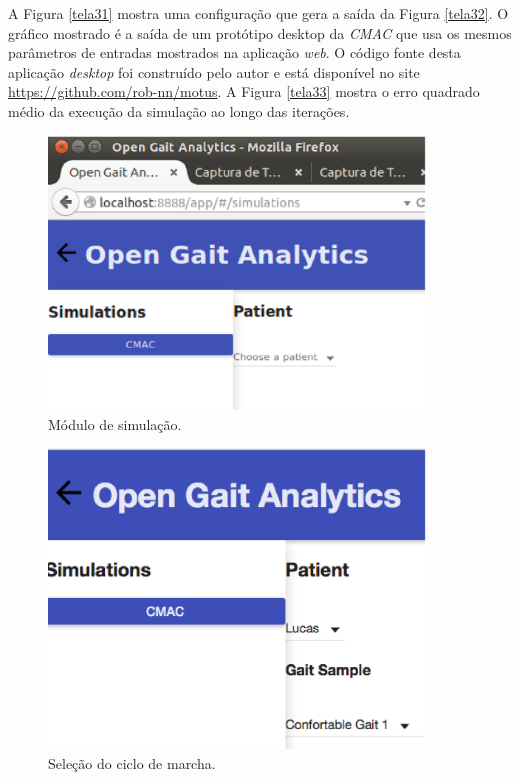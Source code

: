 A Figura \ref{tela31} mostra uma configuração que gera a saída da Figura \ref{tela32}.  O gráfico mostrado é a saída de um protótipo desktop da \emph{CMAC} que usa os mesmos parâmetros de entradas mostrados na aplicação \emph{web}. 
O código fonte desta aplicação \emph{desktop} foi construído pelo autor e está disponível no site \url{https://github.com/rob-nn/motus}.
A Figura \ref{tela33} mostra o erro quadrado médio da execução da simulação ao longo das iterações.

\begin{figure}[ht]
	\centering
	\includegraphics[width=10cm]{figuras/tela27.eps}
	\caption{Módulo de simulação.}
\label{tela27}
\end{figure}

\begin{figure}[ht]
	\centering
	\includegraphics[width=10cm]{figuras/tela28.eps}
	\caption{Seleção do ciclo de marcha.}
\label{tela28}
\end{figure}

